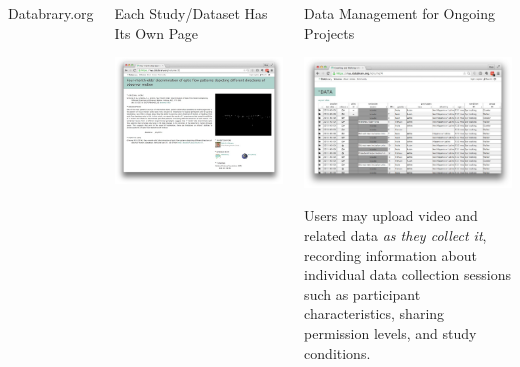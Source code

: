 \documentclass[final]{beamer}
\begin{document}
\begin{frame}{}
\begin{columns}[t]
\begin{block}{Databrary.org}
		\end{block}
		\begin{block}{Each Study/Dataset Has Its Own Page}
			\begin{center}
				\includegraphics[width=\textwidth]{img/volume-31.png}
			\end{center}
		\end{block}
		\begin{block}{Data Management for Ongoing Projects}
			\begin{center}
				\includegraphics[width=\textwidth]{img/spreadsheet.png}
			\end{center}
			Users may upload video and related data \emph{as they collect it}, recording information about individual data collection sessions such as participant characteristics, sharing permission levels, and study conditions. 

\end{block}
\end{columns}
\end{frame}
\end{document}
